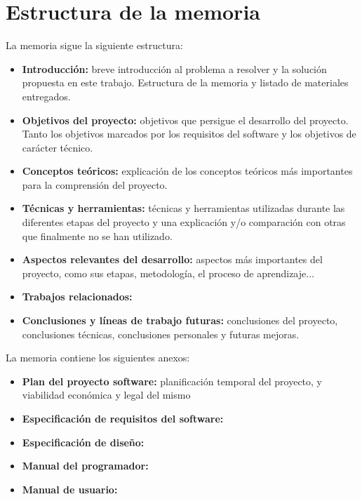 \section{Estructura de la memoria}\label{estructura-de-la-memoria}

La memoria sigue la siguiente estructura:

\begin{itemize}
\tightlist
\item
  \textbf{Introducción:} breve introducción al problema a resolver y la
  solución propuesta en este trabajo. Estructura de la memoria y listado de materiales
  entregados.
\item
  \textbf{Objetivos del proyecto:} objetivos que
  persigue el desarrollo del proyecto. Tanto los objetivos marcados por los requisitos del software y los objetivos de carácter técnico.
\item
  \textbf{Conceptos teóricos:} explicación de los conceptos teóricos más importantes para la comprensión del proyecto.
\item
  \textbf{Técnicas y herramientas:} técnicas y herramientas utilizadas durante las diferentes etapas del proyecto y una explicación y/o comparación con otras que finalmente no se han utilizado.
\item
  \textbf{Aspectos relevantes del desarrollo:} aspectos más importantes del proyecto, como sus etapas, metodología, el proceso de aprendizaje...
\item
  \textbf{Trabajos relacionados:} 
\item
  \textbf{Conclusiones y líneas de trabajo futuras:} conclusiones del proyecto, conclusiones técnicas, conclusiones personales y futuras mejoras.
\end{itemize}

La memoria contiene los siguientes anexos:

\begin{itemize}
\tightlist
\item
  \textbf{Plan del proyecto software:} planificación temporal del proyecto, y viabilidad económica y legal del mismo
\item
  \textbf{Especificación de requisitos del software:}
\item
  \textbf{Especificación de diseño:} 
\item
  \textbf{Manual del programador:} 
\item
  \textbf{Manual de usuario:} 
\end{itemize}





